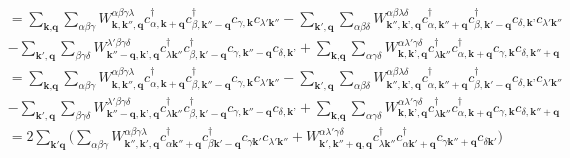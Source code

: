 \documentclass[12pt,english,a4paper]{article}
\newcommand{\dg}{\dagger}
\begin{document}
\begin{appendices}
\begin{align}
	&= \sum_{\textbf{k}, \textbf{q}} \sum_{\alpha \beta \gamma} W^{\alpha \beta \gamma \lambda}_{\textbf{k},\textbf{k}'',\textbf{q}}c_{\alpha, \textbf{k}+\textbf{q}}^\dg c_{\beta, \textbf{k}'' - \textbf{q}}^\dg c_{\gamma, \textbf{k}} c_{\lambda' \textbf{k}''}-
	\sum_{\textbf{k}', \textbf{q}} \sum_{\alpha \beta \delta} W^{\alpha \beta \lambda \delta}_{\textbf{k}'',\textbf{k'},\textbf{q}}c_{\alpha, \textbf{k}''+\textbf{q}}^\dg c_{\beta, \textbf{k}' - \textbf{q}}^\dg c_{\delta, \textbf{k'}} c_{\lambda' \textbf{k}''}\nonumber \\
	&- \sum_{ \textbf{k}', \textbf{q}} \sum_{ \beta \gamma \delta} W^{\lambda' \beta \gamma \delta}_{\textbf{k}''-\textbf{q},\textbf{k'},\textbf{q}}c^\dg_{\lambda \textbf{k}''} c_{\beta, \textbf{k}' - \textbf{q}}^\dg c_{\gamma, \textbf{k}'' - \textbf{q}}c_{\delta, \textbf{k'}} + \sum_{\textbf{k}, \textbf{q}} \sum_{\alpha \gamma \delta} W^{\alpha \lambda' \gamma \delta}_{\textbf{k},\textbf{k'},\textbf{q}}c^\dg_{\lambda \textbf{k}''}  c_{\alpha, \textbf{k}+\textbf{q}}^\dg c_{\gamma, \textbf{k}}c_{\delta, \textbf{k}''+\textbf{q}}\nonumber\\
	&= \sum_{\textbf{k}, \textbf{q}} \sum_{\alpha \beta \gamma} W^{\alpha \beta \gamma \lambda}_{\textbf{k},\textbf{k}'',\textbf{q}}c_{\alpha, \textbf{k}+\textbf{q}}^\dg c_{\beta, \textbf{k}'' - \textbf{q}}^\dg c_{\gamma, \textbf{k}} c_{\lambda' \textbf{k}''}-
	\sum_{\textbf{k}', \textbf{q}} \sum_{\alpha \beta \delta} W^{\alpha \beta \lambda \delta}_{\textbf{k}'',\textbf{k'},\textbf{q}}c_{\alpha, \textbf{k}''+\textbf{q}}^\dg c_{\beta, \textbf{k}' - \textbf{q}}^\dg c_{\delta, \textbf{k'}} c_{\lambda' \textbf{k}''}\nonumber \\
	&- \sum_{ \textbf{k}', \textbf{q}} \sum_{ \beta \gamma \delta} W^{\lambda' \beta \gamma \delta}_{\textbf{k}''-\textbf{q},\textbf{k'},\textbf{q}}c^\dg_{\lambda \textbf{k}''} c_{\beta, \textbf{k}' - \textbf{q}}^\dg c_{\gamma, \textbf{k}'' - \textbf{q}}c_{\delta, \textbf{k'}} + \sum_{\textbf{k}, \textbf{q}} \sum_{\alpha \gamma \delta} W^{\alpha \lambda' \gamma \delta}_{\textbf{k},\textbf{k'},\textbf{q}}c^\dg_{\lambda \textbf{k}''}  c_{\alpha, \textbf{k}+\textbf{q}}^\dg c_{\gamma, \textbf{k}}c_{\delta, \textbf{k}''+\textbf{q}}\nonumber \\ \label{Coulomb Commu}
	&= 2 \sum_{\textbf{k}'\textbf{q}} \bigg(\sum_{\alpha \beta \gamma} W^{\alpha\beta\gamma \lambda}_{\textbf{k}'',\textbf{k} ',\textbf{q}} c^\dg_{\alpha \textbf{k}''+\textbf{q}} c^\dg_{\beta \textbf{k}'-\textbf{q}} c_{\gamma \textbf{k}'} c_{\lambda' \textbf{k}''} + W^{\alpha \lambda' \gamma \delta}_{\textbf{k}',\textbf{k}''+\textbf{q}, \textbf{q}}c^\dg_{\lambda \textbf{k}''} c^\dg_{\alpha \textbf{k}'+\textbf{q}}c_{\gamma \textbf{k}''+\textbf{q}}c_{\delta\textbf{k}'}\bigg)

\end{align}
\end{appendices}
\end{document}
